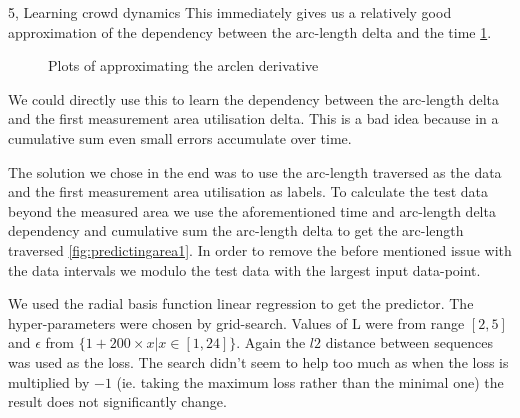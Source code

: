 \begin{task}{5, Learning crowd dynamics}
This immediately gives us a relatively good approximation of the dependency between the arc-length delta and the time \ref{fig:predictingarlenderivative}.

\begin{figure}[H]
\centering
{}
\caption{Plots of approximating the arclen derivative}
\label{fig:predictingarlenderivative}
\end{figure}

We could directly use this to learn the dependency between the arc-length delta and the first measurement area utilisation delta. This is a bad idea because in a cumulative sum even small errors accumulate over time.

The solution we chose in the end was to use the arc-length traversed as the data and the first measurement area utilisation as labels. To calculate the test data beyond the measured area we use the aforementioned time and arc-length delta dependency and cumulative sum the arc-length delta to get the arc-length traversed \ref{fig:predictingarea1}. In order to remove the before mentioned issue with the data intervals we modulo the test data with the largest input data-point.

We used the radial basis function linear regression to get the predictor. The hyper-parameters were chosen by grid-search. Values of L were from range $[2,5]$ and $\epsilon$ from $\{1+200\times x | x \in [1,24]\}$. Again the $l2$ distance between sequences was used as the loss. The search didn't seem to help too much as when the loss is multiplied by $-1$ (ie. taking the maximum loss rather than the minimal one) the result does not significantly change.



\end{task}
